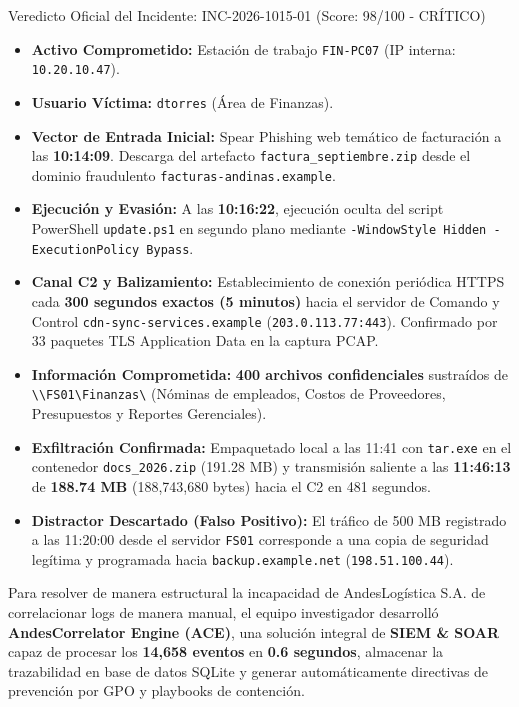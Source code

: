 \documentclass[11pt,a4paper]{article}
\begin{document}
\begin{alertaCritica}{Veredicto Oficial del Incidente: INC-2026-1015-01 (Score: 98/100 - CRÍTICO)}
    \begin{itemize}[leftmargin=*, noitemsep]
        \item \textbf{Activo Comprometido:} Estación de trabajo \texttt{FIN-PC07} (IP interna: \texttt{10.20.10.47}).
        \item \textbf{Usuario Víctima:} \texttt{dtorres} (Área de Finanzas).
        \item \textbf{Vector de Entrada Inicial:} Spear Phishing web temático de facturación a las \textbf{10:14:09}. Descarga del artefacto \texttt{factura\_septiembre.zip} desde el dominio fraudulento \texttt{facturas-andinas.example}.
        \item \textbf{Ejecución y Evasión:} A las \textbf{10:16:22}, ejecución oculta del script PowerShell \texttt{update.ps1} en segundo plano mediante \texttt{-WindowStyle Hidden -ExecutionPolicy Bypass}.
        \item \textbf{Canal C2 y Balizamiento:} Establecimiento de conexión periódica HTTPS cada \textbf{300 segundos exactos (5 minutos)} hacia el servidor de Comando y Control \texttt{cdn-sync-services.example} (\texttt{203.0.113.77:443}). Confirmado por 33 paquetes TLS Application Data en la captura PCAP.
        \item \textbf{Información Comprometida:} \textbf{400 archivos confidenciales} sustraídos de \texttt{\textbackslash\textbackslash FS01\textbackslash Finanzas\textbackslash} (Nóminas de empleados, Costos de Proveedores, Presupuestos y Reportes Gerenciales).
        \item \textbf{Exfiltración Confirmada:} Empaquetado local a las 11:41 con \texttt{tar.exe} en el contenedor \texttt{docs\_2026.zip} (191.28 MB) y transmisión saliente a las \textbf{11:46:13} de \textbf{188.74 MB} (188,743,680 bytes) hacia el C2 en 481 segundos.
        \item \textbf{Distractor Descartado (Falso Positivo):} El tráfico de 500 MB registrado a las 11:20:00 desde el servidor \texttt{FS01} corresponde a una copia de seguridad legítima y programada hacia \texttt{backup.example.net} (\texttt{198.51.100.44}).
    \end{itemize}
\end{alertaCritica}

Para resolver de manera estructural la incapacidad de AndesLogística S.A. de correlacionar logs de manera manual, el equipo investigador desarrolló \textbf{AndesCorrelator Engine (ACE)}, una solución integral de \textbf{SIEM \& SOAR} capaz de procesar los \textbf{14,658 eventos} en \textbf{0.6 segundos}, almacenar la trazabilidad en base de datos SQLite y generar automáticamente directivas de prevención por GPO y playbooks de contención.
\end{document}
